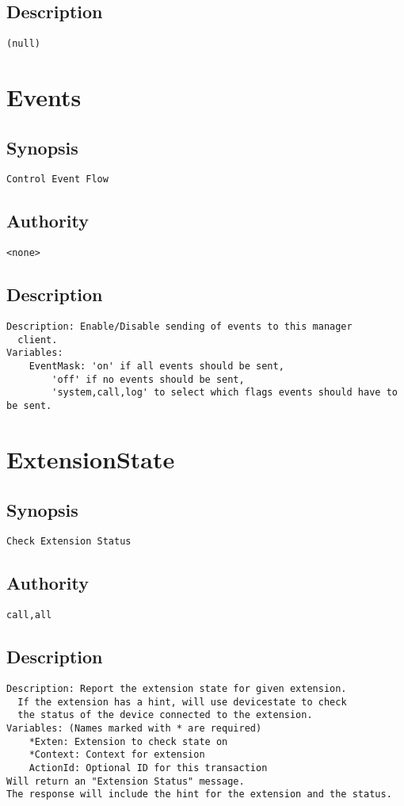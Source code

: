 \subsection{Description}
\begin{verbatim}
(null)
\end{verbatim}


\section{Events}
\subsection{Synopsis}
\begin{verbatim}
Control Event Flow
\end{verbatim}
\subsection{Authority}
\begin{verbatim}
<none>
\end{verbatim}
\subsection{Description}
\begin{verbatim}
Description: Enable/Disable sending of events to this manager
  client.
Variables:
	EventMask: 'on' if all events should be sent,
		'off' if no events should be sent,
		'system,call,log' to select which flags events should have to be sent.

\end{verbatim}


\section{ExtensionState}
\subsection{Synopsis}
\begin{verbatim}
Check Extension Status
\end{verbatim}
\subsection{Authority}
\begin{verbatim}
call,all
\end{verbatim}
\subsection{Description}
\begin{verbatim}
Description: Report the extension state for given extension.
  If the extension has a hint, will use devicestate to check
  the status of the device connected to the extension.
Variables: (Names marked with * are required)
	*Exten: Extension to check state on
	*Context: Context for extension
	ActionId: Optional ID for this transaction
Will return an "Extension Status" message.
The response will include the hint for the extension and the status.

\end{verbatim}


